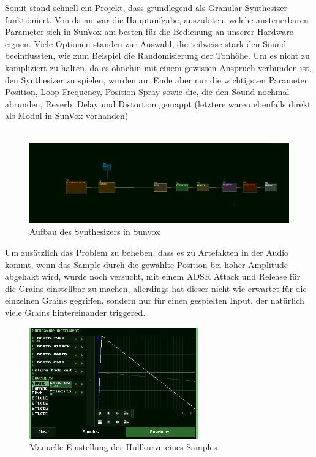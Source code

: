 \documentclass[12pt]{scrartcl}%
\theoremstyle{nonumberplain}
\begin{document}
\noindent Somit stand schnell ein Projekt, dass grundlegend als Granular Synthesizer funktioniert. Von da an war die Hauptaufgabe, auszuloten, welche ansteuerbaren Parameter sich in SunVox am besten für die Bedienung an unserer Hardware eignen. Viele Optionen standen zur Auswahl, die teilweise stark den Sound beeinflussten, wie zum Beispiel die Randomisierung der Tonhöhe. Um es nicht zu kompliziert zu halten, da es ohnehin mit einem gewissen Anspruch verbunden ist, den Synthesizer zu spielen, wurden am Ende aber nur die wichtigsten Parameter Position, Loop Frequency, Position Spray sowie die, die den Sound nochmal abrunden, Reverb, Delay und Distortion gemappt (letztere waren ebenfalls direkt als Modul in SunVox vorhanden)
\\\\
\begin{figure}[h]
\includegraphics[width=\textwidth]{sunvox_2}
  \caption{Aufbau des Synthesizers in Sunvox}
\end{figure}
\newpage
\noindent Um zusätzlich das Problem zu beheben, dass es zu Artefakten in der Audio kommt, wenn das Sample durch die gewählte Position bei hoher Amplitude abgehakt wird, wurde noch versucht, mit einem ADSR Attack und Release für die Grains einstellbar zu machen, allerdings hat dieser nicht wie erwartet für die einzelnen Grains gegriffen, sondern nur für einen gespielten Input, der natürlich viele Grains hintereinander triggered.\\
\begin{figure}
  \centering
  \includegraphics[width=0.65\textwidth]{sunvox_5}
  \caption{Manuelle Einstellung der Hüllkurve eines Samples}
\end{figure}
\end{document}
